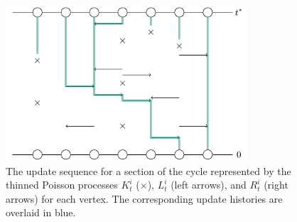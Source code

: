 
	\begin{figure}
		\centering
		\includegraphics[width = 0.8\textwidth]{Figures/IsingCouplingTime/example_histories_1D_thinned_poisson.pdf}
		\caption[The update sequence for a section of the cycle and the corresponding update history from each vertex using the new update rules.]{The update sequence for a section of the cycle represented by the thinned Poisson processes $K_t^i$ ($\times$), $L_t^i$ (left arrows), and $R_t^i$ (right arrows) for each vertex. The corresponding update histories are overlaid in blue.}
		\label{fig:example histories 1D thinned poisson}
	\end{figure}


